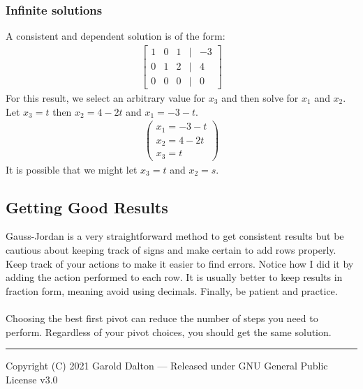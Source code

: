\documentclass[14pt]{extarticle}
\begin{document}
\subsubsection*{Infinite solutions}
A consistent and dependent solution is of the form:
\begin{align*}
	\begin{bmatrix}
		1 & 0 & 1 & | & -3 \\
		0 & 1 & 2 & | & 4 \\
		0 & 0 & 0 & | & 0
	\end{bmatrix}
\end{align*}
For this result, we select an arbitrary value for $x_3$ and then solve for $x_1$ and $x_2$. Let $x_3=t$ then $x_2 = 4-2t$ and $x_1=-3-t$.
\begin{align*}
	\begin{pmatrix}
		x_1 = -3-t	\\
		x_2 = 4 -2t	\\
		x_3 = t	
	\end{pmatrix}
\end{align*}
It is possible that we might let $x_3 = t$ and $x_2=s$.

\subsection*{Getting Good Results}
Gauss-Jordan is a very straightforward method to get consistent results but be cautious about keeping track of signs and make certain to add rows properly. Keep track of your actions to make it easier to find errors. Notice how I did it by adding the action performed to each row. It is usually better to keep results in fraction form, meaning avoid using decimals. Finally, be patient and practice.
\\\\
Choosing the best first pivot can reduce the number of steps you need to perform. Regardless of your pivot choices, you should get the same solution.

\noindent\rule{\textwidth}{1pt}
{\footnotesize Copyright (C) 2021 Garold Dalton --- Released under GNU General Public License v3.0}
\end{document}
